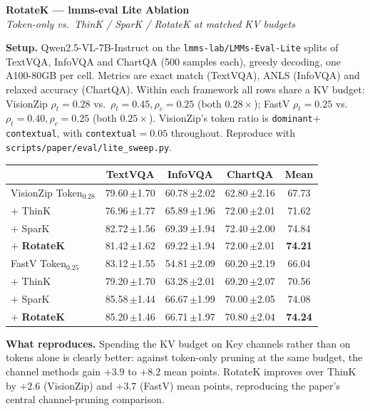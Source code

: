 \documentclass[10pt]{article}
\begin{document}
\begin{center}{\large\textbf{RotateK --- lmms-eval Lite Ablation}}\\[2pt]
{\itshape Token-only vs.\ ThinK / SparK / RotateK at matched KV budgets}\end{center}

\textbf{Setup.} Qwen2.5-VL-7B-Instruct on the \texttt{lmms-lab/LMMs-Eval-Lite} splits
of TextVQA, InfoVQA and ChartQA (500 samples each), greedy decoding, one A100-80GB per
cell. Metrics are exact match (TextVQA), ANLS (InfoVQA) and relaxed accuracy (ChartQA).
Within each framework all rows share a KV budget: VisionZip
$\rho_t{=}0.28$ vs.\ $\rho_t{=}0.45,\rho_c{=}0.25$ (both $0.28\times$); FastV
$\rho_t{=}0.25$ vs.\ $\rho_t{=}0.40,\rho_c{=}0.25$ (both $0.25\times$). VisionZip's
token ratio is \texttt{dominant}$+$\texttt{contextual}, with \texttt{contextual}$=0.05$
throughout. Reproduce with \texttt{scripts/paper/eval/lite\_sweep.py}.

\begin{center}\small
\begin{tabular}{@{}l ccc c@{}}
\toprule
& TextVQA & InfoVQA & ChartQA & \textbf{Mean}\\
\midrule
VisionZip Token$_{0.28}$ & 79.60\,\tiny$\pm$1.70 & 60.78\,\tiny$\pm$2.02 & 62.80\,\tiny$\pm$2.16 & 67.73\\
\quad $+$ ThinK & 76.96\,\tiny$\pm$1.77 & 65.89\,\tiny$\pm$1.96 & 72.00\,\tiny$\pm$2.01 & 71.62\\
\quad $+$ SparK & 82.72\,\tiny$\pm$1.56 & 69.39\,\tiny$\pm$1.94 & 72.40\,\tiny$\pm$2.00 & 74.84\\
\quad $+$ \textbf{RotateK} & 81.42\,\tiny$\pm$1.62 & 69.22\,\tiny$\pm$1.94 & 72.00\,\tiny$\pm$2.01 & \textbf{74.21}\\
\addlinespace[3pt]
FastV Token$_{0.25}$ & 83.12\,\tiny$\pm$1.55 & 54.81\,\tiny$\pm$2.09 & 60.20\,\tiny$\pm$2.19 & 66.04\\
\quad $+$ ThinK & 79.20\,\tiny$\pm$1.70 & 63.28\,\tiny$\pm$2.01 & 69.20\,\tiny$\pm$2.07 & 70.56\\
\quad $+$ SparK & 85.58\,\tiny$\pm$1.44 & 66.67\,\tiny$\pm$1.99 & 70.00\,\tiny$\pm$2.05 & 74.08\\
\quad $+$ \textbf{RotateK} & 85.20\,\tiny$\pm$1.46 & 66.71\,\tiny$\pm$1.97 & 70.80\,\tiny$\pm$2.04 & \textbf{74.24}\\
\bottomrule
\end{tabular}
\end{center}

\textbf{What reproduces.} Spending the KV budget on Key channels rather than on tokens
alone is clearly better: against token-only pruning at the same budget, the channel
methods gain $+3.9$ to $+8.2$ mean points. RotateK improves over ThinK by
$\mathbf{+2.6}$ (VisionZip) and $\mathbf{+3.7}$ (FastV) mean points, reproducing the
paper's central channel-pruning comparison.
\end{document}
